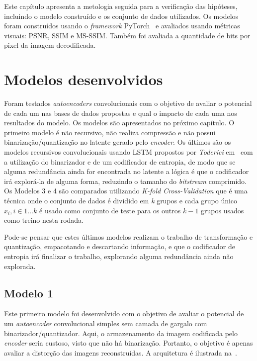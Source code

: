 Este capítulo apresenta a metologia seguida para a verificação das hipóteses, incluindo o modelo construído e os conjunto de dados utilizados. Os modelos foram construídos usando o \textit{framework} PyTorch~\cite{pytorch} e avaliados usando métricas visuais: \acrshort{PSNR}, \acrshort{SSIM} e \acrshort{MS-SSIM}. Também foi avaliada a quantidade de bits por pixel da imagem decodificada.

\section{Modelos desenvolvidos}
Foram testados \textit{autoencoders} convolucionais com o objetivo de avaliar o potencial de cada um nas bases de dados propostas e qual o impacto de cada uma nos resultados do modelo. Os modelos são apresentados no próximo capítulo. O primeiro modelo é não recursivo, não realiza compressão e não possui binarização/quantização no latente gerado pelo \textit{encoder}. Os últimos são os modelos recursivos convolucionais usando \acrshort{LSTM} propostos por \textit{Toderici} em~\cite{toderici2016} com a utilização do binarizador e de um codificador de entropia, de modo que se alguma redundância ainda for encontrada no latente a lógica é que o codificador irá explorá-la de alguma forma, reduzindo o tamanho do \textit{bitstream} comprimido. Os Modelos 3 e 4 são comparados utilizando \textit{K-fold Cross-Validation} que é uma técnica onde o conjunto de dados é dividido em \textit{k} grupos e cada grupo único $x_i, i \in {1 \dots k}$ é usado como conjunto de teste para os outros $k-1$ grupos usados como treino nesta rodada. 

Pode-se pensar que estes últimos modelos realizam o trabalho de transformação e quantização, empacotando e descartando informação, e que o codificador de entropia irá finalizar o trabalho, explorando alguma redundância ainda não explorada.

\subsection{Modelo 1}
Este primeiro modelo foi desenvolvido com o objetivo de avaliar o potencial de um \textit{autoencoder} convolucional simples sem camada de gargalo com binarizador/quantizador. Aqui, o armazenamento da imagem codificada pelo \textit{encoder} seria custoso, visto que não há binarização. Portanto, o objetivo é apenas avaliar a distorção das imagens reconstruídas. A arquitetura é ilustrada na~.
